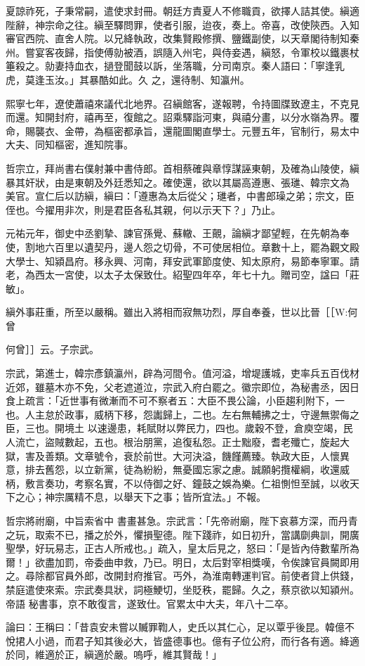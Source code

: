\begin{pinyinscope}
 夏諒祚死，子秉常嗣，遣使求封冊。朝廷方責夏人不修職貢，欲擇人詰其使。縝適陛辭，神宗命之往。縝至驛問罪，使者引服，迨夜，奏上。帝喜，改使陝西。入知審官西院、直舍人院。以兄絳執政，改集賢殿修撰、鹽鐵副使，以天章閣待制知秦州。嘗宴客夜歸，指使傅勍被酒，誤隨入州宅，與侍妾遇，縝怒，令軍校以鐵裹杖箠殺之。勍妻持血衣，撾登聞鼓以訴，坐落職，分司南京。秦人語曰：「寧逢乳虎，莫逢玉汝。」其暴酷如此。久
 之，還待制、知瀛州。



 熙寧七年，遼使蕭禧來議代北地界。召縝館客，遂報聘，令持圖牒致遼主，不克見而還。知開封府，禧再至，復館之。詔乘驛詣河東，與禧分畫，以分水嶺為界。覆命，賜襲衣、金帶，為樞密都承旨，還龍圖閣直學士。元豐五年，官制行，易太中大夫、同知樞密，進知院事。



 哲宗立，拜尚書右僕射兼中書侍郎。首相蔡確與章惇謀誣東朝，及確為山陵使，縝暴其奸狀，由是東朝及外廷悉知之。確使還，欲以其屬高遵惠、張璡、韓宗文為
 美官。宣仁后以訪縝，縝曰：「遵惠為太后從父；璡者，中書郎璪之弟；宗文，臣侄也。今擢用非次，則是君臣各私其親，何以示天下？」乃止。



 元祐元年，御史中丞劉摯、諫官孫覺、蘇轍、王覿，論縝才鄙望輕，在先朝為奉使，割地六百里以遺契丹，邊人怨之切骨，不可使居相位。章數十上，罷為觀文殿大學士、知潁昌府。移永興、河南，拜安武軍節度使、知太原府，易節奉寧軍。請老，為西太一宮使，以太子太保致仕。紹聖四年卒，年七十九。贈司空，諡曰「莊
 敏」。



 縝外事莊重，所至以嚴稱。雖出入將相而寂無功烈，厚自奉養，世以比晉［［W:何曾
 
 何曾］］云。子宗武。



 宗武，第進士，韓宗彥鎮瀛州，辟為河間令。值河溢，增堤護城，吏率兵五百伐材近郊，雖墓木亦不免，父老遮道泣，宗武入府白罷之。徽宗即位，為秘書丞，因日食上疏言：「近世事有微漸而不可不察者五：大臣不畏公論，小臣趨利附下，一也。人主怠於政事，威柄下移，怨讟歸上，二也。左右無輔拂之士，守邊無禦侮之臣，三也。開境土
 以速邊患，耗賦財以弊民力，四也。歲穀不登，倉庾空竭，民人流亡，盜賊數起，五也。根治朋黨，追復私怨。正士黜廢，耆老殲亡，旋起大獄，害及善類。文章號令，衰於前世。大河決溢，饑饉薦臻。執政大臣，人懷異意，排去舊怨，以立新黨，徒為紛紛，無憂國忘家之慮。誠願躬攬權綱，收還威柄，敷言奏功，考察名實，不以侍御之好、鐘鼓之娛為樂。仁祖惻怛至誠，以收天下之心；神宗厲精不息，以舉天下之事；皆所宜法。」不報。



 哲宗將祔廟，中旨索省中
 書畫甚急。宗武言：「先帝祔廟，陛下哀慕方深，而丹青之玩，取索不已，播之於外，懼損聖德。陛下踐祚，如日初升，當講劘典訓，開廣聖學，好玩易志，正古人所戒也。」疏入，皇太后見之，怒曰：「是皆內侍數輩所為爾！」欲盡加罰，帝委曲申救，乃已。明日，太后對宰相獎嘆，令俟諫官員闕即用之。尋除都官員外郎，改開封府推官。丐外，為淮南轉運判官。前使者貸上供錢，禁庭遣使來索。宗武奏具狀，詞極鯁切，坐貶秩，罷歸。久之，蔡京欲以知潁州。帝語
 秘書事，京不敢復言，遂致仕。官累太中大夫，年八十二卒。



 論曰：王稱曰：「昔袁安未嘗以贓罪鞫人，史氏以其仁心，足以覃乎後昆。韓億不悅捃人小過，而君子知其後必大，皆盛德事也。億有子位公府，而行各有適。絳適於同，維適於正，縝適於嚴。嗚呼，維其賢哉！」



\end{pinyinscope}